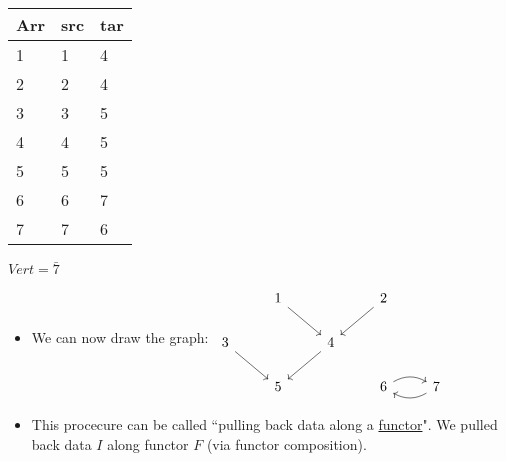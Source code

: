   \begin{minipage}{0.48\textwidth}

    \begin{tabular}{|l|l|l|}
      \hline
      Arr & src & tar \\ \hline
      1   & 1   & 4   \\ \hline
      2   & 2   & 4   \\ \hline
      3   & 3   & 5   \\ \hline
      4   & 4   & 5   \\ \hline
      5   & 5   & 5   \\ \hline
      6   & 6   & 7   \\ \hline
      7   & 7   & 6   \\ \hline
    \end{tabular}
  \end{minipage}
  $Vert = \bar{7}$

  \begin{itemize}
    \item  We can now draw the graph: \,$\begin{tikzcd}& 1 \arrow[rd] && 2 \arrow[ld]&\\3 \arrow[rd] && 4 \arrow[ld] &&\\& 5&& 6 \arrow[r, bend left] & 7 \arrow[l, bend left]\end{tikzcd}$\,
    \item This procecure can be called ``pulling back data along a \hyperref[D3.35]{functor}". We pulled back data $I$ along functor $F$ (via functor composition).

  \end{itemize}